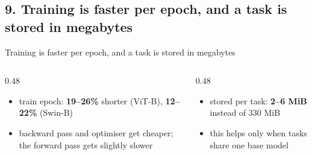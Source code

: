 \documentclass[aspectratio=169,11pt]{beamer}
\begin{document}
\subsection{9. Training is faster per epoch, and a task is stored in megabytes}
\begin{frame}{Training is faster per epoch, and a task is stored in megabytes}
\vspace{-1mm}
{\centering\par}
\vspace{-1mm}
\begin{columns}[T]
\begin{column}{0.48\textwidth}
\footnotesize
\begin{itemize}
  \item train epoch: \textbf{19--26\%} shorter (ViT-B), \textbf{12--22\%} (Swin-B)
  \item backward pass and optimiser get cheaper; the forward pass gets slightly slower
\end{itemize}
\end{column}
\begin{column}{0.48\textwidth}
\footnotesize
\begin{itemize}
  \item stored per task: \textbf{2--6 MiB} instead of 330 MiB
  \item this helps only when tasks share one base model
\end{itemize}
\end{column}
\end{columns}
\end{frame}

\end{document}
